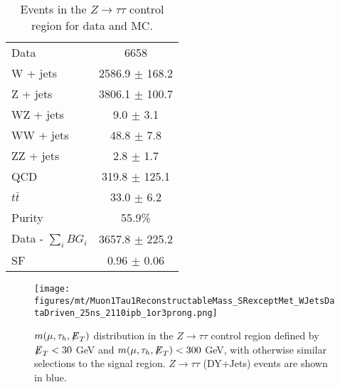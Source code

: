 \begin{table}[htbp!]
\begin{center}
 \caption{ Events in the $Z\rightarrow\tau\tau$ control region for data and MC.}
 \begin{tabular}{| l | c |}
 \hline\hline
Data & 6658 \\
W + jets & 2586.9 $\pm$ 168.2 \\
Z + jets & 3806.1 $\pm$ 100.7 \\
WZ + jets & 9.0 $\pm$ 3.1 \\
WW + jets & 48.8 $\pm$ 7.8 \\
ZZ + jets & 2.8 $\pm$ 1.7 \\
QCD & 319.8 $\pm$ 125.1 \\
$t\bar{t}$ & 33.0 $\pm$ 6.2 \\ \hline
Purity & 55.9\% \\
Data - $\sum\limits_{i} BG_{i}$ & 3657.8 $\pm$ 225.2 \\ \hline
SF & 0.96 $\pm$ 0.06 \\
 \hline
 \hline
 \end{tabular}
 \label{table:theztautauControlTable}
\end{center}
\end{table}

\begin{figure}
\begin{center}
\texttt{[image: figures/mt/Muon1Tau1ReconstructableMass\_SRexceptMet\_WJetsDataDriven\_25ns\_2110ipb\_1or3prong.png]}
\caption{ $m(\mu,\tau_{h},{\not\mathrel{E}}_T)$ distribution in the $Z \to \tau\tau$ control region defined by ${\not\mathrel{E}}_T < 30$ GeV and $m(\mu,\tau_{h},{\not\mathrel{E}}_T) < 300$ GeV, with 
otherwise similar selections to the signal region. $Z \to \tau\tau$ (DY+Jets) events are shown in blue.}
\label{fig:ZtautauControlPlots}
\end{center}
\end{figure}

